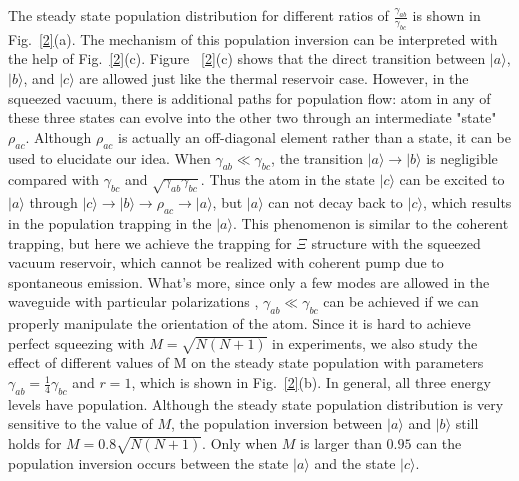 \documentclass[aps,showpacs,twocolumn,twoside,groupedaddress]{revtex4}
\begin{document}
The steady state population distribution for different ratios of $\frac{\gamma_{ab}}{\gamma_{bc}}$ is shown in Fig.~\ref{2}(a). The mechanism of this population inversion can be interpreted with the help of Fig.~\ref{2}(c). Figure ~\ref{2}(c) shows that the direct transition between $|a\rangle$, $|b\rangle$, and $|c\rangle$ are allowed just like the thermal reservoir case. However, in the squeezed vacuum, there is additional paths for population flow: atom in any of these three states can evolve into the other two through an intermediate "state" $\rho_{ac}$. Although $\rho_{ac}$ is actually an off-diagonal element rather than a state, it can be used to elucidate our idea. When $\gamma_{ab}\ll\gamma_{bc}$, the transition $|a\rangle\rightarrow|b\rangle$ is negligible compared with $\gamma_{bc}$ and $\sqrt{\gamma_{ab}\gamma_{bc}}$. Thus the atom in the state $|c\rangle$ can be excited to $|a\rangle$ through $|c\rangle\rightarrow|b\rangle\rightarrow\rho_{ac}\rightarrow|a\rangle$, but $|a\rangle$ can not decay back to $|c\rangle$, which results in the population trapping in the $|a\rangle$. This phenomenon is similar to the coherent trapping, but here we achieve the trapping for $\Xi$ structure with the squeezed vacuum reservoir, which cannot be realized with coherent pump due to spontaneous emission. What's more, since only a few modes are allowed in the waveguide with particular polarizations \cite{You2018},  $\gamma_{ab}\ll\gamma_{bc}$ can be achieved if we can properly manipulate the orientation of the atom. Since it is hard to achieve perfect squeezing with $M=\sqrt{N(N+1)}$ in experiments, we also study the effect of different values of M on the steady state population with parameters $\gamma_{ab}=\frac{1}{4}\gamma_{bc}$ and $r=1$, which is shown in Fig.~\ref{2}(b). In general, all three energy levels have population. Although the steady state population distribution is very sensitive to the value of $M$, the population inversion between $|a\rangle$ and $|b\rangle$ still holds for $M=0.8\sqrt{N(N+1)}$. Only when $M$ is larger than $0.95$ can the population inversion occurs between the state $|a\rangle$ and the state $|c\rangle$.
\end{document}
